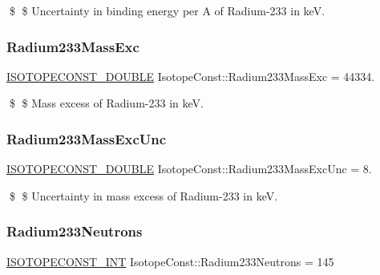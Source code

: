\$ \$ Uncertainty in binding energy per A of Radium-\/233 in keV. \mbox{\label{group___isotope_const-_radium-_ra233_ga9ca4ae8e645252c89e3a4b91505c5aa2}} 
\subsubsection{\texorpdfstring{Radium233\+Mass\+Exc}{Radium233MassExc}}
{\footnotesize\ttfamily \mbox{\hyperlink{group___isotope_const-_macros_ga8f45a7272ce02c0b4c65c44636ed719a}{I\+S\+O\+T\+O\+P\+E\+C\+O\+N\+S\+T\+\_\+\+D\+O\+U\+B\+LE}} Isotope\+Const\+::\+Radium233\+Mass\+Exc = 44334.}

\$ \$ Mass excess of Radium-\/233 in keV. \mbox{\label{group___isotope_const-_radium-_ra233_gaa867d1fd5366a303c0b3b8f5880874b3}} 
\subsubsection{\texorpdfstring{Radium233\+Mass\+Exc\+Unc}{Radium233MassExcUnc}}
{\footnotesize\ttfamily \mbox{\hyperlink{group___isotope_const-_macros_ga8f45a7272ce02c0b4c65c44636ed719a}{I\+S\+O\+T\+O\+P\+E\+C\+O\+N\+S\+T\+\_\+\+D\+O\+U\+B\+LE}} Isotope\+Const\+::\+Radium233\+Mass\+Exc\+Unc = 8.}

\$ \$ Uncertainty in mass excess of Radium-\/233 in keV. \mbox{\label{group___isotope_const-_radium-_ra233_ga667214f896967f656711f0ed5d5e9342}} 
\subsubsection{\texorpdfstring{Radium233\+Neutrons}{Radium233Neutrons}}
{\footnotesize\ttfamily \mbox{\hyperlink{group___isotope_const-_macros_ga5f18360b3e99483a35c32d789e62621c}{I\+S\+O\+T\+O\+P\+E\+C\+O\+N\+S\+T\+\_\+\+I\+NT}} Isotope\+Const\+::\+Radium233\+Neutrons = 145}

